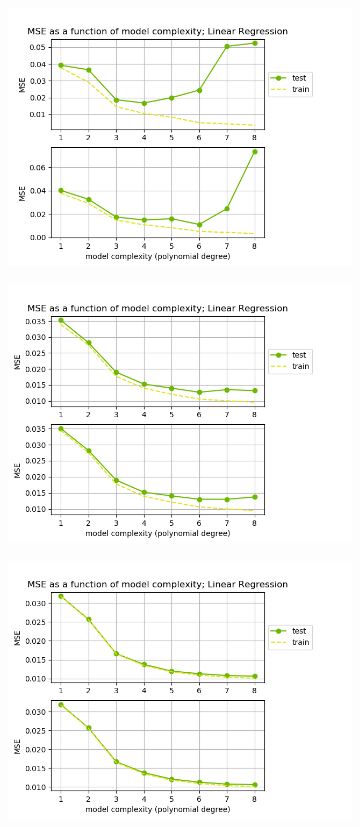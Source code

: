 \begin{figure}[!ht]
\begin{subfigure}{\textwidth}
  \centering
  \includegraphics[width=0.55\linewidth]{images/mse/fake_linear_mse_p08_n10.png}
\end{subfigure}
\begin{subfigure}{\textwidth}
  \centering
  \includegraphics[width=0.55\linewidth]{images/mse/fake_linear_mse_p08_n21.png}
\end{subfigure}
\begin{subfigure}{\textwidth}
  \centering
  \includegraphics[width=0.55\linewidth]{images/mse/fake_linear_mse_p08_n50.png}

\end{subfigure}
\end{figure}
